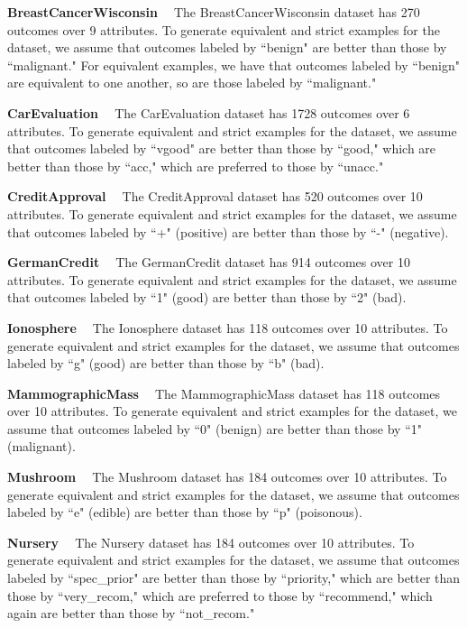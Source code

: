 
\smallskip \noindent \textbf{BreastCancerWisconsin \ }
The BreastCancerWisconsin dataset has 270 outcomes over 9 attributes.
To generate equivalent and strict examples for the dataset,
we assume that outcomes labeled by ``benign" are better than
those by ``malignant."
For equivalent examples, we have that outcomes labeled by ``benign" are equivalent
to one another, so are those labeled by ``malignant."

\smallskip \noindent \textbf{CarEvaluation \ }
The CarEvaluation dataset has 1728 outcomes over 6 attributes.
To generate equivalent and strict examples for the dataset,
we assume that outcomes labeled by ``vgood" are better than
those by ``good," which are better than those
by ``acc," which are preferred to those by ``unacc."

\smallskip \noindent \textbf{CreditApproval \ }
The CreditApproval dataset has 520 outcomes over 10 attributes.
To generate equivalent and strict examples for the dataset,
we assume that outcomes labeled by ``+" (positive) are better than
those by ``-" (negative).

\smallskip \noindent \textbf{GermanCredit \ }
The GermanCredit dataset has 914 outcomes over 10 attributes.
To generate equivalent and strict examples for the dataset,
we assume that outcomes labeled by ``1" (good) are better than
those by ``2" (bad).

\smallskip \noindent \textbf{Ionosphere \ }
The Ionosphere dataset has 118 outcomes over 10 attributes.
To generate equivalent and strict examples for the dataset,
we assume that outcomes labeled by ``g" (good) are better than
those by ``b" (bad).

\smallskip \noindent \textbf{MammographicMass \ }
The MammographicMass dataset has 118 outcomes over 10 attributes.
To generate equivalent and strict examples for the dataset,
we assume that outcomes labeled by ``0" (benign) are better than
those by ``1" (malignant).

\smallskip \noindent \textbf{Mushroom \ }
The Mushroom dataset has 184 outcomes over 10 attributes.
To generate equivalent and strict examples for the dataset,
we assume that outcomes labeled by ``e" (edible) are better than
those by ``p" (poisonous).

\smallskip \noindent \textbf{Nursery \ }
The Nursery dataset has 184 outcomes over 10 attributes.
To generate equivalent and strict examples for the dataset,
we assume that outcomes labeled by ``spec\_prior" are better than
those by ``priority," which are better than those
by ``very\_recom," which are preferred to those by ``recommend,"
which again are better than those by ``not\_recom."

